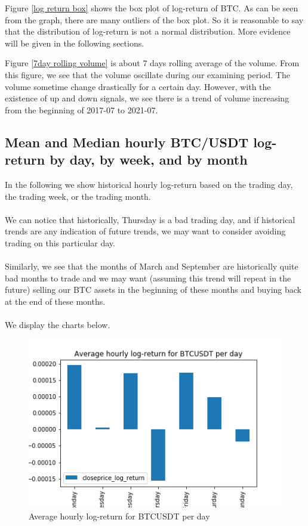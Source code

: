 \documentclass[twoside]{report}
\begin{document}
\begin{spacing}{1}
Figure \ref{log return box} shows the box plot of log-return of BTC. As can be seen from the graph, there are many outliers of the box plot. So it is reasonable to say that the distribution of log-return is not a normal distribution. More evidence will be given in the following sections.



Figure \ref{7day rolling volume} is about 7 days rolling average of the volume. From this figure, we see that the volume oscillate during our examining period. The volume sometime change drastically for a certain day. However, with the existence of up and down signals, we see there is a trend of volume increasing from the beginning of 2017-07 to 2021-07.


\subsection{Mean and Median hourly BTC/USDT log-return by day, by week, and by month}

In the following we show historical hourly log-return based on the trading day, the trading week, or the trading month.
\\ \\
We can notice that historically, Thursday is a bad trading day, and if historical trends are any indication of future trends, we may want to consider avoiding trading on this particular day.
\\ \\
Similarly, we see that the months of March and September are historically quite bad months to trade and we may want (assuming this trend will repeat in the future) selling our BTC assets in the beginning of these months and buying back at the end of these months.
\\ \\
We display the charts below.
\begin{figure}[!htbp]
    \centering
    \includegraphics[scale = 0.5]{Images/Average hourly log-return for BTCUSDT per day.png}
    \caption{Average hourly log-return for BTCUSDT per day}
    \label{Average hourly log-return for BTCUSDT per day}
\end{figure}


\end{spacing}
\end{document}
